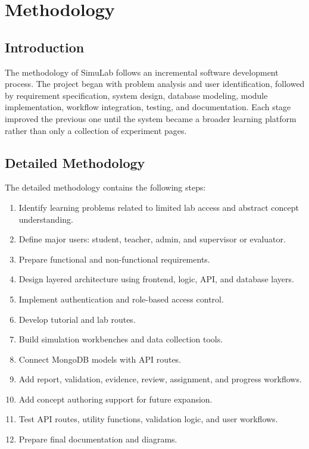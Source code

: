 \documentclass[12pt,a4paper]{report}
\begin{document}
\chapter{Methodology}

\section{Introduction}
The methodology of SimuLab follows an incremental software development process. The project began with problem analysis and user identification, followed by requirement specification, system design, database modeling, module implementation, workflow integration, testing, and documentation. Each stage improved the previous one until the system became a broader learning platform rather than only a collection of experiment pages.

\section{Detailed Methodology}
The detailed methodology contains the following steps:

\begin{enumerate}[label=\arabic*.]
\item Identify learning problems related to limited lab access and abstract concept understanding.
\item Define major users: student, teacher, admin, and supervisor or evaluator.
\item Prepare functional and non-functional requirements.
\item Design layered architecture using frontend, logic, API, and database layers.
\item Implement authentication and role-based access control.
\item Develop tutorial and lab routes.
\item Build simulation workbenches and data collection tools.
\item Connect MongoDB models with API routes.
\item Add report, validation, evidence, review, assignment, and progress workflows.
\item Add concept authoring support for future expansion.
\item Test API routes, utility functions, validation logic, and user workflows.
\item Prepare final documentation and diagrams.
\end{enumerate}
\end{document}
